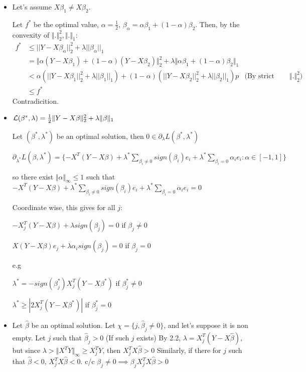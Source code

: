 \documentclass[12pt]{article}
\newcommand{\norm}[1]{\Vert #1 \Vert}
\begin{document}
\begin{itemize}
\item
  Let's assume  $X\beta_1 \ne X\beta_2$.
  
  Let $f^*$ be the optimal value, $\alpha = \frac12$, $\beta_{\alpha} = \alpha \beta_1 + (1-\alpha) \beta_2$.
  Then, by the convexity of $\norm{.}_2^2, \norm{.}_1$:
  \begin{align*}
    f^* &\le ||Y - X \beta_{\alpha}||_2^2 + \lambda ||\beta_{\alpha}||_1
    \\&= \norm{ \alpha (Y - X \beta_1) + (1-\alpha)(Y - X\beta_2)}_2^2
      + \lambda \norm{\alpha \beta_1 + (1-\alpha)\beta_2}_1
    \\&<
      \alpha \left(||Y - X \beta_1||_2^2 + \lambda ||\beta_1||_1\right)
        + (1-\alpha)\left(||Y - X \beta_2||_2^2 + \lambda ||\beta_2||_1\right)p
        &\text{(By strict convexity of $\norm{.}_2^2$)}
    \\&\le f^*
  \end{align*}
  Contradicition.
  
\item
  ${\cal L}(\beta^*, \lambda) = \frac12 \norm{Y-X\beta}_2^2 + \lambda \norm{\beta}_1$

  Let $(\beta^*, \lambda^*)$ be an optimal solution, then $0 \in \partial_{\lambda} L (\beta^*, \lambda^*)$

  $\partial_{\lambda^*} L (\beta, \lambda^*) = \{ -X^T(Y-X\beta) +  \lambda^* \sum_{\beta_i \ne 0} sign(\beta_i) e_i + \lambda^* \sum_{\beta_i = 0}  \alpha_i e_i : \alpha \in [-1, 1] \}$

  so there exist $\norm{\alpha}_{\infty} \le 1$ such that $-X^T(Y-X\beta) +  \lambda^* \sum_{\beta_i \ne 0} sign(\beta_i) e_i + \lambda^* \sum_{\beta_i = 0}  \alpha_i e_i = 0$
  
  Coordinate wise, this gives for all $j$:
  
  $ -X_j^T (Y - X\beta) + \lambda sign(\beta_j) = 0$ if $\beta_j \ne 0$
  
  $ X (Y - X\beta)e_j + \lambda \alpha_i sign(\beta_j) = 0$ if $\beta_j = 0$
  
  e.g
  
  $ \lambda^* = -sign(\beta_j^*) X_j^T(Y - X\beta^*)$ if $\beta_j^* \ne 0$
  
  $ \lambda^* \ge |2  X_j^T(Y - X\beta^*)|$ if $\beta_j^* = 0$
  
  
\item
  Let $\hat \beta$ be an optimal solution. Let $\chi = \{ j, \hat \beta_j \ne 0 \}$, and let's suppose it is non empty.
  Let $j$ such that $\hat \beta_j > 0$ (If such $j$ exists)
  By 2.2,  $\lambda = X_j^T (Y - X \hat \beta)$, but since $\lambda > \norm{X^TY}_{\infty} \ge X_j^TY$, then $X_j^TX\hat \beta > 0$
  Similarly, if there for $j$ such that $\hat \beta < 0$, $X_j^TX\hat \beta < 0$.
  c/c $\beta_j \ne 0 \implies \beta_j X_j^TX\hat \beta > 0$


\end{itemize}
\end{document}
